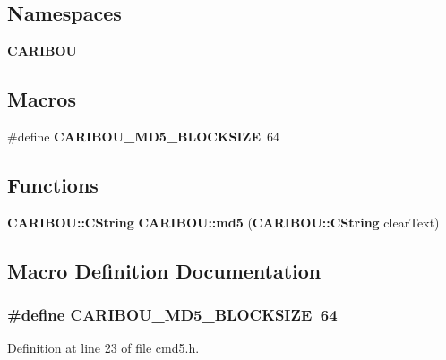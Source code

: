 \subsection*{Namespaces}
\begin{DoxyCompactItemize}
\item 
{\bf C\-A\-R\-I\-B\-O\-U}
\end{DoxyCompactItemize}
\subsection*{Macros}
\begin{DoxyCompactItemize}
\item 
\#define {\bf C\-A\-R\-I\-B\-O\-U\-\_\-\-M\-D5\-\_\-\-B\-L\-O\-C\-K\-S\-I\-Z\-E}~64
\end{DoxyCompactItemize}
\subsection*{Functions}
\begin{DoxyCompactItemize}
\item 
{\bf C\-A\-R\-I\-B\-O\-U\-::\-C\-String} {\bf C\-A\-R\-I\-B\-O\-U\-::md5} ({\bf C\-A\-R\-I\-B\-O\-U\-::\-C\-String} clear\-Text)
\end{DoxyCompactItemize}


\subsection{Macro Definition Documentation}
\subsubsection[{C\-A\-R\-I\-B\-O\-U\-\_\-\-M\-D5\-\_\-\-B\-L\-O\-C\-K\-S\-I\-Z\-E}]{\setlength{\rightskip}{0pt plus 5cm}\#define C\-A\-R\-I\-B\-O\-U\-\_\-\-M\-D5\-\_\-\-B\-L\-O\-C\-K\-S\-I\-Z\-E~64}\label{cmd5_8h_a81ebbc0b0b7b4db40eadc63bc51ddfc1}


Definition at line 23 of file cmd5.\-h.

